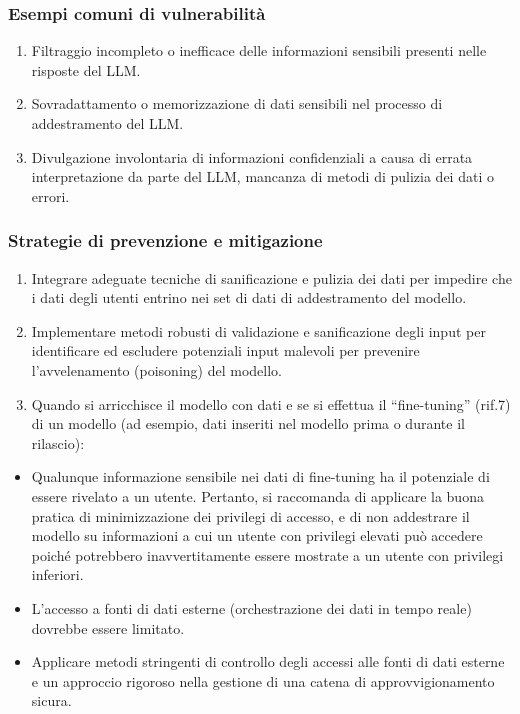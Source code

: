 \documentclass[
]{article}
\providecommand{\tightlist}{%
  \setlength{\itemsep}{0pt}\setlength{\parskip}{0pt}}
\begin{document}
\subsubsection{Esempi comuni di
vulnerabilità}\label{esempi-comuni-di-vulnerabilituxe0}

\begin{enumerate}
\def\labelenumi{\arabic{enumi}.}
\tightlist
\item
  Filtraggio incompleto o inefficace delle informazioni sensibili
  presenti nelle risposte del LLM.
\item
  Sovradattamento o memorizzazione di dati sensibili nel processo di
  addestramento del LLM.
\item
  Divulgazione involontaria di informazioni confidenziali a causa di
  errata interpretazione da parte del LLM, mancanza di metodi di pulizia
  dei dati o errori.
\end{enumerate}

\subsubsection{Strategie di prevenzione e
mitigazione}\label{strategie-di-prevenzione-e-mitigazione}

\begin{enumerate}
\def\labelenumi{\arabic{enumi}.}
\tightlist
\item
  Integrare adeguate tecniche di sanificazione e pulizia dei dati per
  impedire che i dati degli utenti entrino nei set di dati di
  addestramento del modello.
\item
  Implementare metodi robusti di validazione e sanificazione degli input
  per identificare ed escludere potenziali input malevoli per prevenire
  l'avvelenamento (poisoning) del modello.
\item
  Quando si arricchisce il modello con dati e se si effettua il
  ``fine-tuning'' (rif.7) di un modello (ad esempio, dati inseriti nel
  modello prima o durante il rilascio):
\end{enumerate}

\begin{itemize}
\tightlist
\item
  Qualunque informazione sensibile nei dati di fine-tuning ha il
  potenziale di essere rivelato a un utente. Pertanto, si raccomanda di
  applicare la buona pratica di minimizzazione dei privilegi di accesso,
  e di non addestrare il modello su informazioni a cui un utente con
  privilegi elevati può accedere poiché potrebbero inavvertitamente
  essere mostrate a un utente con privilegi inferiori.
\item
  L'accesso a fonti di dati esterne (orchestrazione dei dati in tempo
  reale) dovrebbe essere limitato.
\item
  Applicare metodi stringenti di controllo degli accessi alle fonti di
  dati esterne e un approccio rigoroso nella gestione di una catena di
  approvvigionamento sicura.
\end{itemize}
\end{document}
